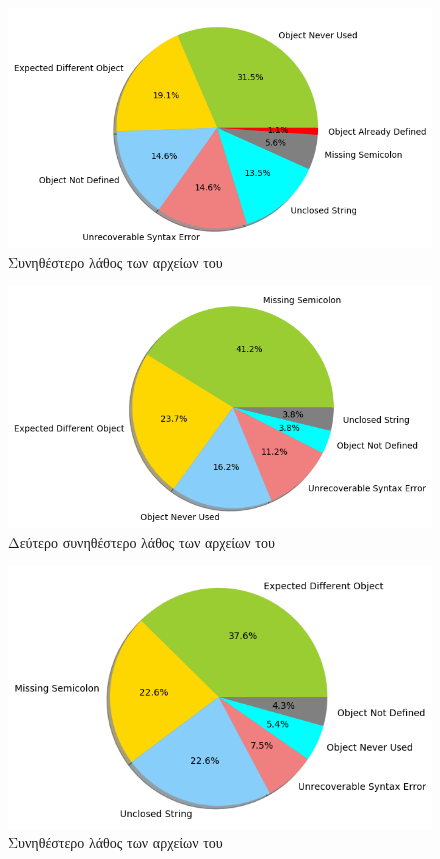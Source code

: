 \begin{figure}
	\caption{Συνηθέστερο λάθος των αρχείων του }
	\label{MCE-temp-char}
	\includegraphics[width=\textwidth, keepaspectratio]{images/MCE-temp-char.png}
\end{figure}

\begin{figure}
	\caption{Δεύτερο συνηθέστερο λάθος των αρχείων του }
	\label{MCE2-temp-char}
	\includegraphics[width=\textwidth, keepaspectratio]{images/MCE2-temp-char.png}
\end{figure}

\begin{figure}
	\caption{Συνηθέστερο λάθος των αρχείων του }
	\label{MCE2-temp-labeled}
	\includegraphics[width=\textwidth, keepaspectratio]{images/MCE-temp-labeled.png}
\end{figure}

